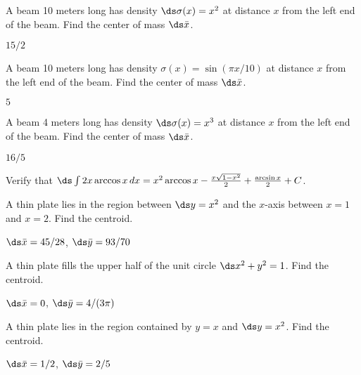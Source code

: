 \begin{enumialphparenastyle}

\begin{ex}
A beam 10 meters long has density $\ds \sigma(x)=x^2$ at
distance $x$ from the left end of the beam. Find the center of mass
$\ds \bar x$.
\begin{sol}
$15/2$
\end{sol}
\end{ex}

\begin{ex}
A beam 10 meters long has density $\sigma(x)=\sin(\pi x/10)$ at
distance $x$ from the left end of the beam. Find the center of mass
$\ds \bar x$.
\begin{sol}
$5$
\end{sol}
\end{ex}

\begin{ex}
A beam 4 meters long has density $\ds \sigma(x)=x^3$ at
distance $x$ from the left end of the beam. Find the center of mass
$\ds \bar x$.
\begin{sol}
$16/5$
\end{sol}
\end{ex}

\begin{ex}
Verify that $\ds\int 2x\arccos x\,dx=
x^2\arccos x-{x\sqrt{1-x^2}\over2}+{\arcsin x\over 2}+C$.
\end{ex}

\begin{ex}
A thin plate lies in the region between $\ds y=x^2$ and the $x$-axis
between $x=1$ and $x=2$. Find the centroid.
\begin{sol}
$\ds \bar x=45/28$, $\ds \bar y = 93/70$
\end{sol}
\end{ex}

\begin{ex}
A thin plate fills the upper half of the unit circle
$\ds x^2+y^2=1$. Find the centroid.
\begin{sol}
$\ds \bar x=0$, $\ds \bar y=4/(3\pi)$
\end{sol}
\end{ex}

\begin{ex}
A thin plate lies in the region contained by $y=x$ and
$\ds y=x^2$. Find the centroid.
\begin{sol}
$\ds \bar x=1/2$, $\ds \bar y=2/5$
\end{sol}
\end{ex}


\end{enumialphparenastyle}
